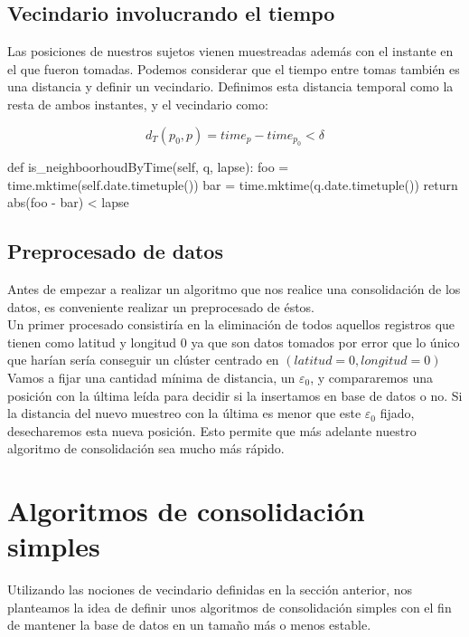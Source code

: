 \documentclass[a4paper, 12pt]{article}
\begin{document}
\subsection{Vecindario involucrando el tiempo}

Las posiciones de nuestros sujetos vienen muestreadas adem\'as con el instante en el que fueron tomadas. Podemos considerar que el tiempo entre tomas tambi\'en es una distancia y definir un vecindario. Definimos esta distancia temporal como la resta de ambos instantes, y el vecindario como:

$$ d_T(p_0, p) = time_p - time_{p_0} < \delta $$

\begin{python}
	def is_neighboorhoudByTime(self, q, lapse):
		foo = time.mktime(self.date.timetuple())
		bar = time.mktime(q.date.timetuple())
		return abs(foo - bar) < lapse
\end{python}


\pagebreak
\subsection{Preprocesado de datos}
Antes de empezar a realizar un algoritmo que nos realice una consolidaci\'on de los datos, es conveniente realizar un preprocesado de \'estos. \\

Un primer procesado consistir\'ia en la eliminaci\'on de todos aquellos registros que tienen como latitud y longitud $0$ ya que son datos tomados por error que lo \'unico que har\'ian ser\'ia conseguir un cl\'uster centrado en $(latitud = 0, longitud = 0)$ \\

Vamos a fijar una cantidad m\'inima de distancia, un $\varepsilon_0$, y compararemos una posici\'on con la \'ultima le\'ida para decidir si la insertamos en base de datos o no. Si la distancia del nuevo muestreo con la \'ultima es menor que este $\varepsilon_0$ fijado, desecharemos esta nueva posici\'on. Esto permite que m\'as adelante nuestro algoritmo de consolidaci\'on sea mucho m\'as r\'apido. \\


\pagebreak
\section{Algoritmos de consolidaci\'on simples}

Utilizando las nociones de vecindario definidas en la secci\'on anterior, nos planteamos la idea de definir unos algoritmos de consolidaci\'on simples con el fin de mantener la base de datos en un tama\~no m\'as o menos estable. \\
\end{document}
